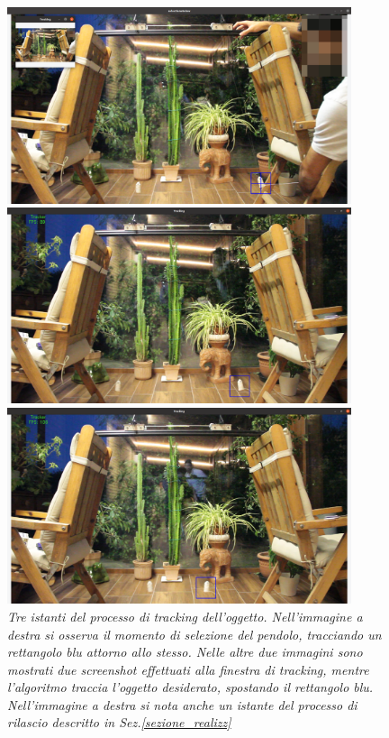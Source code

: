 \documentclass[11pt, a4paper, twoside]{article}
\begin{document}
\begin{figure}[h!]
  \centering
\begin{minipage}{0.3\textwidth}
  \centering
  \includegraphics[width=0.9\textwidth]{../../media/img/tracking_1.png}
\end{minipage}
\begin{minipage}{0.3\textwidth}
  \centering
  \includegraphics[width=0.9\textwidth]{../../media/img/tracking_2.png}
\end{minipage}
\begin{minipage}{0.3\textwidth}
  \centering
  \includegraphics[width=0.9\textwidth]{../../media/img/tracking_3.png}
\end{minipage}
\caption{\textit{Tre istanti del processo di tracking dell'oggetto.
Nell'immagine a destra si osserva il momento di selezione del pendolo, tracciando un rettangolo blu attorno 
allo stesso. Nelle altre due immagini sono mostrati due screenshot effettuati alla 
finestra di tracking, mentre l'algoritmo traccia l'oggetto desiderato, spostando il rettangolo blu.
Nell'immagine a destra si nota anche un istante del processo di rilascio descritto in Sez.\ref{sezione_realizz}}}
\label{photo_tracking}
\end{figure}
\end{document}
